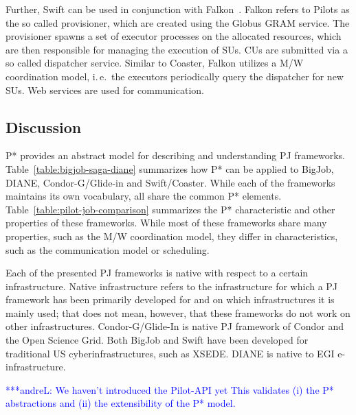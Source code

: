 \documentclass[conference,final]{IEEEtran}
\newcommand{\alnote}[1]{ {\textcolor{blue} { ***andreL: #1 }}}
\newcommand{\alnote}[1]{}
\newcommand{\pilots}{Pilots\xspace}
\newcommand{\cus}{CUs\xspace}
\newcommand{\condorg}{Condor-G/Glide-In\xspace}
\begin{document}
Further, Swift can be used in conjunction with Falkon~\cite{1362680}. Falkon
refers to \pilots as the so called provisioner, which are created using the
Globus GRAM service. The provisioner spawns a set of executor processes on the
allocated resources, which are then responsible for managing the execution of
SUs. \cus are submitted via a so called dispatcher service. Similar to Coaster,
Falkon utilizes a M/W coordination model, i.\,e.\ the executors periodically
query the dispatcher for new SUs. Web services are used for communication.


\subsection{Discussion}

P* provides an abstract model for describing and understanding PJ
frameworks. Table~\ref{table:bigjob-saga-diane} summarizes how P* can
be applied to BigJob, DIANE, Condor-G/Glide-in and Swift/Coaster. While each of 
the frameworks maintains its own vocabulary, all share the common P* elements. 
Table~\ref{table:pilot-job-comparison} summarizes the P* characteristic and 
other properties of these frameworks. While most of these frameworks share many 
properties, such as the M/W coordination model, they differ in characteristics, 
such as the communication model or scheduling.

Each of the presented PJ frameworks is native with respect to a certain
infrastructure. Native infrastructure refers to the infrastructure for which a
PJ framework has been primarily developed for and on which infrastructures it is
mainly used; that does not mean, however, that these frameworks do not work on
other infrastructures. \condorg is native PJ framework of Condor and the
Open Science Grid. Both BigJob and Swift have been developed for traditional
US cyberinfrastructures, such as XSEDE. DIANE is native to EGI e-infrastructure.




\alnote{We haven't introduced the Pilot-API yet This validates (i)
the P* abstractions and (ii) the extensibility of the P*
model.}
\end{document}
